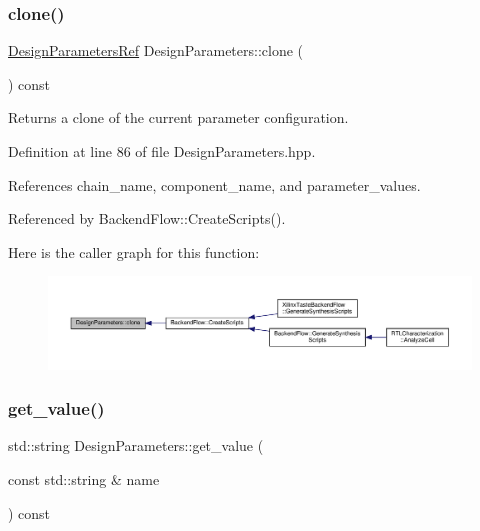 \subsubsection{\texorpdfstring{clone()}{clone()}}
{\footnotesize\ttfamily \hyperlink{DesignParameters_8hpp_ae36bb1c4c9150d0eeecfe1f96f42d157}{Design\+Parameters\+Ref} Design\+Parameters\+::clone (\begin{DoxyParamCaption}{ }\end{DoxyParamCaption}) const\hspace{0.3cm}{\ttfamily [inline]}}



Returns a clone of the current parameter configuration. 



Definition at line 86 of file Design\+Parameters.\+hpp.



References chain\+\_\+name, component\+\_\+name, and parameter\+\_\+values.



Referenced by Backend\+Flow\+::\+Create\+Scripts().

Here is the caller graph for this function\+:
\nopagebreak
\begin{figure}[H]
\begin{center}
\leavevmode
\includegraphics[width=350pt]{d7/d62/structDesignParameters_a908a02002e611884c4b7af3a742460c8_icgraph}
\end{center}
\end{figure}
\mbox{\label{structDesignParameters_a806361f8a2596f9f6dea7f73155dd871}} 
\subsubsection{\texorpdfstring{get\+\_\+value()}{get\_value()}}
{\footnotesize\ttfamily std\+::string Design\+Parameters\+::get\+\_\+value (\begin{DoxyParamCaption}\item[{const std\+::string \&}]{name }\end{DoxyParamCaption}) const\hspace{0.3cm}{\ttfamily [inline]}}



